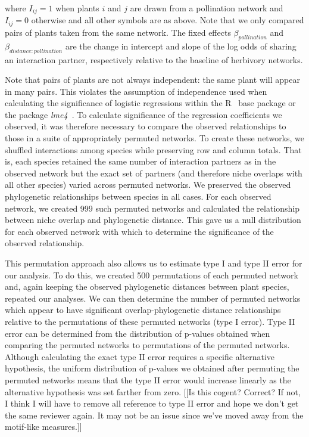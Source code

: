 \documentclass[12pt]{article}
\begin{document}
\begin{spacing}{1.5}
  where $I_{ij}=1$ when plants $i$ and $j$ are drawn from a 
  pollination network and $I_{ij}=0$ otherwise and all other symbols 
  are as above. Note that we only compared pairs of plants taken from the 
  same network. The fixed effects $\beta_{pollination}$ and $\beta_{distance:pollination}$ 
  are the change in intercept and slope of the log odds of sharing an 
  interaction partner, respectively relative to the baseline of 
  herbivory networks.


  Note that pairs of plants are not always independent: the same plant will 
  appear in many pairs. This violates the assumption of independence used 
  when calculating the significance of logistic regressions within 
  the R~\citep{R} base package or the package \emph{lme4}~\citep{lme4}. To 
  calculate significance of the regression coefficients we observed, it was 
  therefore necessary to compare the observed relationships to those in a 
  suite of appropriately permuted networks. To create these networks, we 
  shuffled interactions among species while preserving row and column 
  totals. That is, each species retained the same number of interaction 
  partners as in the observed network but the exact set of partners (and 
  therefore niche overlaps with all other species) varied across permuted 
  networks. We preserved the observed phylogenetic relationships between 
  species in all cases. For each observed network, we created 999 such 
  permuted networks and calculated the relationship between niche overlap 
  and phylogenetic distance. This gave us a null distribution for each 
  observed network with which to determine the significance of the observed 
  relationship.


  This permutation approach also allows us to estimate type I and type II 
  error for our analysis. To do this, we created 500 permutations of each 
  permuted network and, again keeping the observed phylogenetic distances 
  between plant species, repeated our analyses. We can then determine the 
  number of permuted networks which appear to have significant 
  overlap-phylogenetic distance relationships relative to the permutations 
  of these permuted networks (type I error). Type II error can be determined
  from the distribution of p-values obtained when comparing the permuted 
  networks to permutations of the permuted networks. Although calculating 
  the exact type II error requires a specific alternative hypothesis, the 
  uniform distribution of p-values we obtained after permuting the permuted 
  networks means that the type II error would increase linearly as the 
  alternative hypothesis was set farther from zero. [[Is this cogent? Correct? If not, I think I will have to remove all reference to type II error and hope we don't get the same reviewer again. It may not be an issue since we've moved away from the motif-like measures.]]



\end{spacing}
\end{document}
